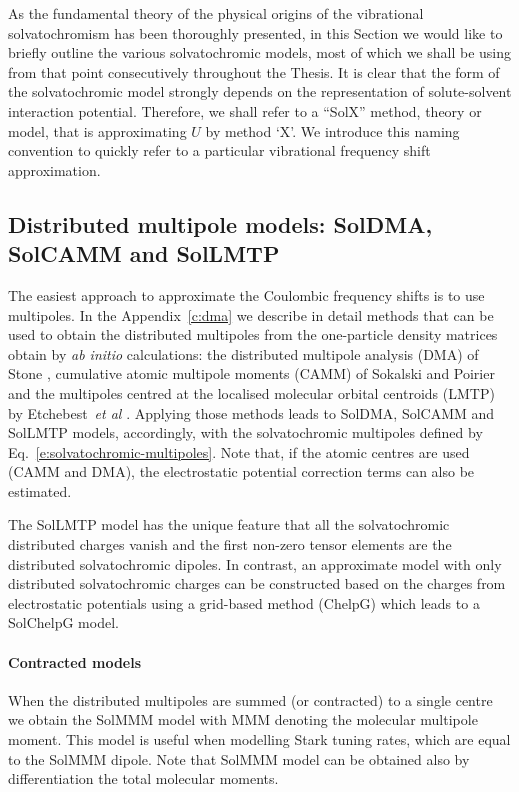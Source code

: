 \documentclass[a4paper,titlepage,twoside,fleqn,12pt]{book}
\begin{document}
\begin{refsection}
As the fundamental theory of the physical origins of the vibrational
solvatochromism has been thoroughly presented, 
in this Section we would like to briefly outline
the various solvatochromic models, most of which 
we shall be using from that point 
consecutively throughout the Thesis. It is clear
that the form of the solvatochromic model strongly depends
on the representation of solute\hyp{}solvent interaction potential.
Therefore, we shall refer to
a ``SolX'' method, theory or model, that is approximating $U$
by method `X'. We introduce this naming convention to quickly refer to a
particular vibrational frequency shift approximation. 


\subsection{Distributed multipole models: SolDMA, SolCAMM and SolLMTP\label{s:solx-electrost}}

The easiest approach to approximate the Coulombic frequency shifts
is to use multipoles. In the Appendix~\ref{c:dma}
we describe in detail methods that can be used to obtain
the distributed multipoles from the one\hyp{}particle density matrices
obtain by \emph{ab initio} calculations: the distributed multipole analysis (DMA) of
Stone \citep{Stone.JCTC.2005}, cumulative atomic multipole moments (CAMM)
of Sokalski and Poirier \citep{Sokalski.Poirier.CPL.1983}
and the multipoles centred at the localised molecular orbital centroids (LMTP)
by Etchebest~\emph{et al} \citep{Etchebest.Lavery.Pullman.TheorChimActa.1982}.
Applying those methods leads to SolDMA, SolCAMM and SolLMTP models, accordingly, with the 
solvatochromic multipoles defined by Eq.~\eqref{e:solvatochromic-multipoles}. 
Note that, if the atomic centres are used (CAMM and DMA), the electrostatic potential
correction terms can also be estimated.

The SolLMTP model has the unique feature that all the solvatochromic 
distributed charges vanish and the first non\hyp{}zero tensor elements
are the distributed solvatochromic dipoles. In contrast, an approximate model 
with only distributed solvatochromic charges can be constructed based on the
charges from electrostatic potentials using a grid\hyp{}based 
method \citep{Breneman.Wiberg.JCC.1990} (ChelpG)
which leads to a SolChelpG model.
%
\paragraph{Contracted models\label{p:solx-electrost-contracted}}
When the distributed multipoles are summed (or contracted)
to a single centre we obtain the SolMMM model with MMM denoting 
the molecular multipole moment. This model is useful when
modelling Stark tuning rates, which are equal to
the SolMMM dipole. Note that SolMMM model can be obtained
also by differentiation the total molecular moments.


\end{refsection}
\end{document}
